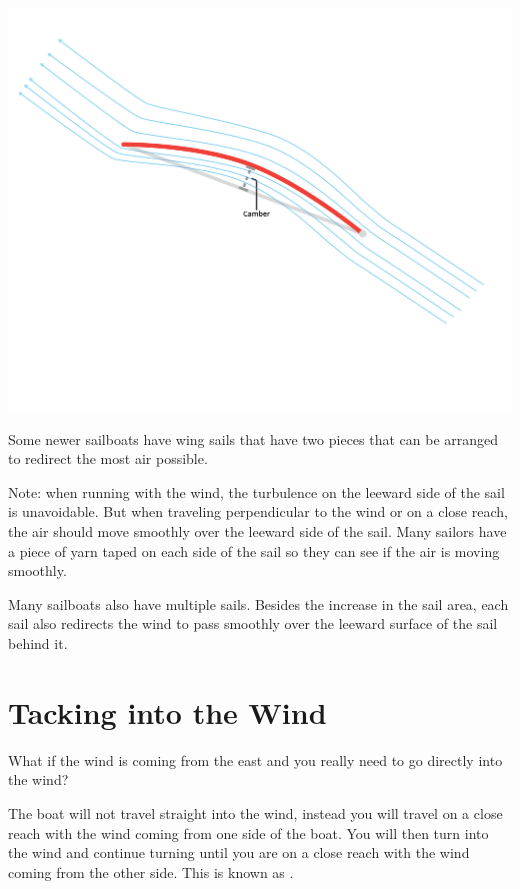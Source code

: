 \begin{center}
    \includegraphics[width=.75\textwidth]{camber.png}
    
\end{center}

Some newer sailboats have wing sails that have two pieces that can be arranged to redirect the most air possible.

Note: when running with the wind,  the turbulence on the leeward side of the sail is unavoidable.   But when traveling perpendicular to the wind or on a close reach,  the air should move smoothly over the leeward side of the sail.   Many sailors have a piece of yarn taped on each side of the sail so they can see if the air is moving smoothly.

Many sailboats also have multiple sails.  Besides the increase in the sail area,  each sail also redirects the wind to pass smoothly over the leeward surface of the sail
behind it.
\section{Tacking into the Wind}

What if the wind is coming from the east and you really need to go directly into the wind?  

The boat will not travel straight into the wind,  instead you will travel on a close reach with the wind coming from one side of the boat. You will then turn into the wind and continue turning
until you are on a close reach with the wind coming from the other side.  This is known as .

